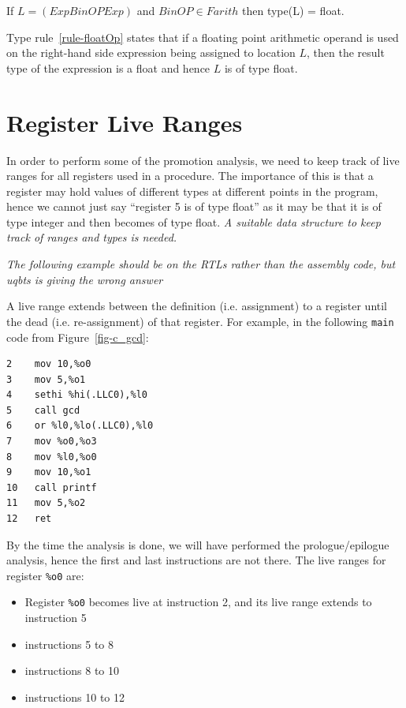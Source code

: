\begin{typerule}
If $L = (Exp BinOP Exp)$ and $BinOP \in Farith$ then type(L) = float.
\label{rule-floatOp}
\end{typerule}

Type rule~\ref{rule-floatOp} states that if a floating point arithmetic
operand is used on the right-hand side expression being assigned to 
location $L$, then the result type of the expression is a float and
hence $L$ is of type float.

\fi


\section{Register Live Ranges}
In order to perform some of the promotion analysis, we need to 
keep track of live ranges for all registers used in a procedure. 
The importance of this is that a register may hold values of 
different types at different points in the program, hence we 
cannot just say ``register 5 is of type float'' as it may be
that it is of type integer and then becomes of type float.  
\emph{A suitable data structure to keep track of ranges and 
types is needed.}

\emph{The following example should be on the RTLs rather than
the assembly code, but uqbts is giving the wrong answer}

A live range extends between the definition (i.e. assignment) 
to a register until the dead (i.e. re-assignment) of that register. 
For example, in the following \texttt{main} code from Figure~\ref{fig-c_gcd}: 
\begin{verbatim}
2    mov 10,%o0
3    mov 5,%o1
4    sethi %hi(.LLC0),%l0
5    call gcd  
6    or %l0,%lo(.LLC0),%l0
7    mov %o0,%o3
8    mov %l0,%o0
9    mov 10,%o1
10   call printf  
11   mov 5,%o2
12   ret
\end{verbatim}

By the time the analysis is done, we will have performed the 
prologue/epilogue analysis, hence the first and last instructions 
are not there.  The live ranges for register \texttt{\%o0} are: 
\begin{itemize}
\item Register \texttt{\%o0} becomes live at instruction 2, 
	and its live range extends to instruction 5 
\item instructions 5 to 8 
\item instructions 8 to 10
\item instructions 10 to 12
\end{itemize}


